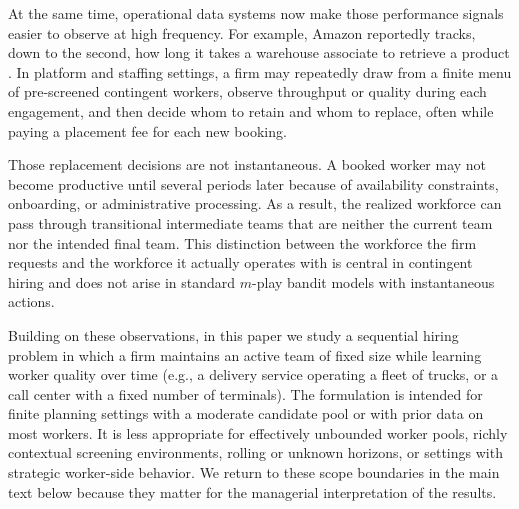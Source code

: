 \documentclass[opre,blindrev]{informs3}
\begin{document}
At the same time, operational data systems now make those performance signals easier to observe at high frequency. For example, Amazon reportedly tracks, down to the second, how long it takes a warehouse associate to retrieve a product \citep{Vincent2015}. In platform and staffing settings, a firm may repeatedly draw from a finite menu of pre-screened contingent workers, observe throughput or quality during each engagement, and then decide whom to retain and whom to replace, often while paying a placement fee for each new booking.

Those replacement decisions are not instantaneous. A booked worker may not become productive until several periods later because of availability constraints, onboarding, or administrative processing. As a result, the realized workforce can pass through transitional intermediate teams that are neither the current team nor the intended final team. This distinction between the workforce the firm requests and the workforce it actually operates with is central in contingent hiring and does not arise in standard \(m\)-play bandit models with instantaneous actions.

Building on these observations, in this paper we study a sequential hiring problem in which a firm maintains an active team of fixed size while learning worker quality over time (e.g., a delivery service operating a fleet of trucks, or a call center with a fixed number of terminals). The formulation is intended for finite planning settings with a moderate candidate pool or with prior data on most workers. It is less appropriate for effectively unbounded worker pools, richly contextual screening environments, rolling or unknown horizons, or settings with strategic worker-side behavior. We return to these scope boundaries in the main text below because they matter for the managerial interpretation of the results.

\vspace{-.1in}
\end{document}
